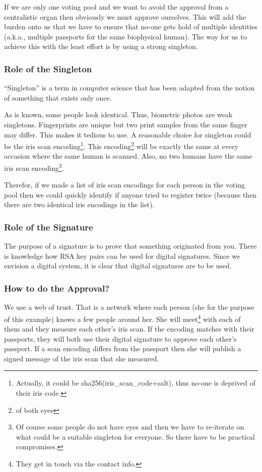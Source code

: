 \documentclass{article}
\theoremstyle{definition}
\begin{document}
	If we are only one voting pool and we want to avoid the approval from a centralistic organ then obviously we must approve ourselves. This will add the burden onto us that we have to ensure that no-one gets hold of multiple identities (a.k.a., multiple passports for the same biophysical human). The way for us to achieve this with the least effort is by using a strong singleton.
	
	\subsubsection{Role of the Singleton}
	``Singleton'' is a term in computer science that has been adapted from the notion of something that exists only once.
	
	As is known, some people look identical. Thus, biometric photos are weak singletons. Fingerprints are unique but two print samples from the same finger may differ. This makes it tedious to use. A reasonable choice for singleton could be the iris scan encoding\footnote{Actually, it could be sha256(iris\_scan\_code+salt), thus no-one is deprived of their iris code.}. This encoding\footnote{of both eyes} will be exactly the same at every occasion where the same human is scanned. Also, no two humans have the same iris scan encoding\footnote{Of course some people do not have eyes and then we have to re-iterate on what could be a suitable singleton for everyone. So there have to be practical compromises.}.
	
	Therefor, if we made a list of iris scan encodings for each person in the voting pool then we could quickly identify if anyone tried to register twice (because then there are two identical iris encodings in the list).
	
	\subsubsection{Role of the Signature}
	The purpose of a signature is to prove that something originated from you. There is knowledge how RSA key pairs can be used for digital signatures. Since we envision a digital system, it is clear that digital signatures are to be used.
	
	\subsubsection{How to do the Approval?}
	We use a web of trust. That is a network where each person (she for the purpose of this example) knows a few people around her. She will meet\footnote{They get in touch via the contact info.} with each of them and they measure each other's iris scan. If the encoding matches with their passports, they will both use their digital signature to approve each other's passport. If a scan encoding differs from the passport then she will publish a signed message of the iris scan that she measured.
	
\end{document}
